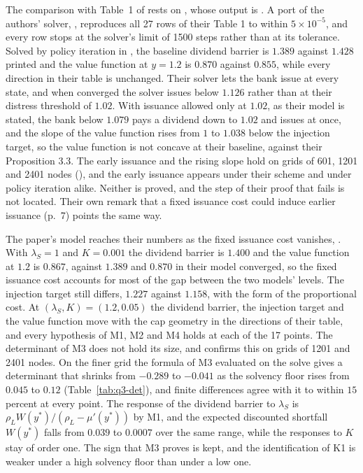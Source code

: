 The comparison with Table~1 of \citet{bayraktar2026} rests on
, whose output is . A port of the authors'
solver, , reproduces all 27 rows of their
Table 1 to within $5\times10^{-5}$, and every row stops at the solver's limit
of 1500 steps rather than at its tolerance. Solved by policy iteration in
, the baseline dividend barrier is $1.389$
against $1.428$ printed and the value function at $y=1.2$ is $0.870$ against
$0.855$, while every direction in their table is unchanged. Their solver lets
the bank issue at every state, and when converged the solver issues below $1.126$ rather
than at their distress threshold of $1.02$. With issuance allowed only at
$1.02$, as their model is stated, the bank below $1.079$ pays a dividend down
to $1.02$ and issues at once, and the slope of the value function rises from
$1$ to $1.038$ below the injection target, so the value function is not
concave at their baseline, against their Proposition 3.3. The early issuance
and the rising slope hold on grids of 601, 1201 and 2401 nodes
(), and the early
issuance appears under their scheme and under policy iteration alike. Neither
is proved, and the step of their proof that fails is not located. Their own
remark that a fixed issuance cost could induce earlier issuance (p.~7) points
the same way.

The paper's model reaches their numbers as the fixed issuance cost vanishes,
. With $\lambda_S=1$ and $K=0.001$ the
dividend barrier is $1.400$ and the value function at $1.2$ is $0.867$,
against $1.389$ and $0.870$ in their model converged, so the fixed issuance
cost accounts for most of the gap between the two models' levels. The
injection target still differs, $1.227$ against $1.158$, with the form of the
proportional cost. At
$(\lambda_S,K)=(1.2,0.05)$ the dividend barrier, the injection target and the
value function move with the cap geometry in the directions of their table,
and every hypothesis of M1, M2 and M4 holds at each of the 17 points. The
determinant of M3 does not hold its size, and
 confirms this on grids of 1201 and 2401
nodes. On the finer grid the formula of M3 evaluated on the solve gives a
determinant that shrinks from $-0.289$ to $-0.041$ as the solvency floor rises
from $0.045$ to $0.12$ (Table~\ref{tab:q3-det}), and finite differences agree
with it to within $15$ percent at every point. The response of the dividend
barrier to $\lambda_S$ is $\rho_LW(y^*)/(\rho_L-\mu'(y^*))$ by M1, and the
expected discounted shortfall $W(y^*)$ falls from $0.039$ to $0.0007$ over the
same range, while the responses to $K$ stay of order one. The sign that M3
proves is kept, and the identification of K1 is weaker under a high solvency
floor than under a low one.

